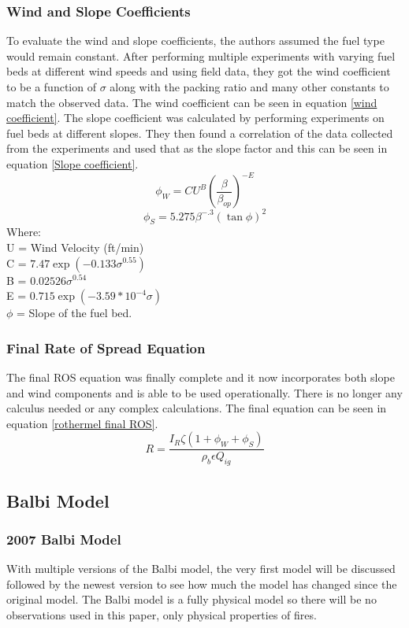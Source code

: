 \documentclass{article}
\begin{document}
\subsubsection{Wind and Slope Coefficients}
\indent To evaluate the wind and slope coefficients, the authors assumed the fuel type would remain constant. After performing multiple experiments with varying fuel beds at different wind speeds and using field data, they got the wind coefficient to be a function of $\sigma$ along with the packing ratio and many other constants to match the observed data. The wind coefficient can be seen in equation \ref{wind coefficient}. The slope coefficient was calculated by performing experiments on fuel beds at different slopes. They then found a correlation of the data collected from the experiments and used that as the slope factor and this can be seen in equation \ref{Slope coefficient}.
\begin{equation}
	\label{wind coefficient}
	\phi _ W = C U^{B} (\frac {\beta} {\beta_{op}}) ^ {-E}
\end{equation}
\begin{equation}
	\label{Slope coefficient}
	\phi _ S = 5.275 \beta ^ {-.3} (\tan \phi)^{2}
\end{equation}
Where: \\
U = Wind Velocity (ft/min) \\
C = $7.47 \exp(-0.133 \sigma^{0.55})$ \\
B = $0.02526 \sigma^{0.54}$\\
E = $0.715 \exp(-3.59 * 10^{-4} \sigma)$\\
$\phi$ = Slope of the fuel bed. 
\subsubsection{Final Rate of Spread Equation}
\indent The final ROS equation was finally complete and it now incorporates both slope and wind components and is able to be used operationally. There is no longer any calculus needed or any complex calculations. The final equation can be seen in equation \ref{rothermel final ROS}. 
\begin{equation}
	\label{rothermel final ROS} 
	R = \frac {I_R \zeta (1 + \phi _ W + \phi _ S )} {\rho _ b \epsilon Q_{ig}}
\end{equation}
\subsection{Balbi Model}
\subsubsection*{2007 Balbi Model}
\indent With multiple versions of the Balbi model, the very first model will be discussed followed by the newest version to see how much the model has changed since the original model. The Balbi model is a fully physical model so there will be no observations used in this paper, only physical properties of fires.
\end{document}
